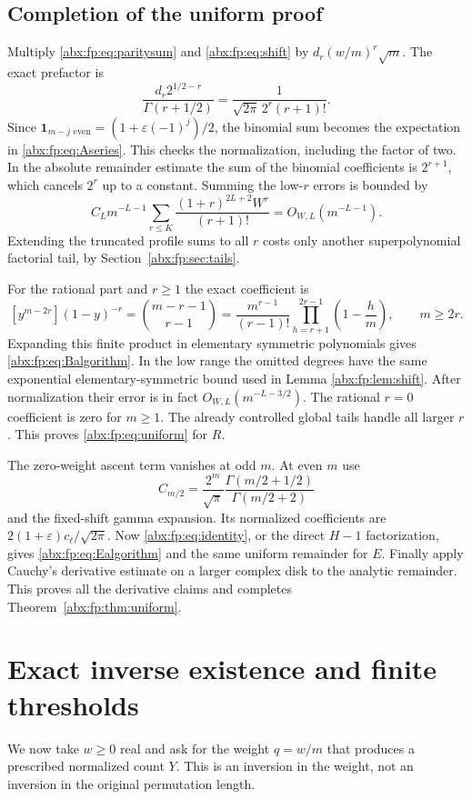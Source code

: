 \documentclass[11pt,letterpaper]{article}
\numberwithin{equation}{section}
\theoremstyle{remark}\newtheorem{remark}[theorem]{Remark}
\newcommand{\eps}{\varepsilon}
\newcommand{\ind}{\mathbf 1}
\newcommand{\sq}{\sqrt{2\pi}}
\begin{document}
\subsection{Completion of the uniform proof}\label{abx:fp:sub:completion}
Multiply \eqref{abx:fp:eq:paritysum} and \eqref{abx:fp:eq:shift} by
$d_r(w/m)^r\sqrt m$. The exact prefactor is
\[
 \frac{d_r2^{1/2-r}}{\Gamma(r+1/2)}
     =\frac1{\sq\,2^r(r+1)!}.
\]
Since $\ind_{m-j\text{ even}}=(1+\eps(-1)^j)/2$, the binomial sum
becomes the expectation in \eqref{abx:fp:eq:Aseries}. This checks the
normalization, including the factor of two. In the absolute remainder
estimate the sum of the binomial coefficients is $2^{r+1}$, which
cancels $2^r$ up to a constant. Summing the low-$r$ errors is bounded by
\begin{equation}\label{abx:fp:eq:sumerror}
 C_Lm^{-L-1}\sum_{r\le K}\frac{(1+r)^{2L+2}W^r}{(r+1)!}
      =O_{W,L}(m^{-L-1}).
\end{equation}
Extending the truncated profile sums to all $r$ costs only another
superpolynomial factorial tail, by Section~\ref{abx:fp:sec:tails}.

For the rational part and $r\ge1$ the exact coefficient is
\begin{equation}\label{abx:fp:eq:rational}
 [y^{m-2r}](1-y)^{-r}
  =\binom{m-r-1}{r-1}
  =\frac{m^{r-1}}{(r-1)!}
        \prod_{h=r+1}^{2r-1}\left(1-\frac hm\right),
 \qquad m\ge2r.
\end{equation}
Expanding this finite product in elementary symmetric polynomials gives
\eqref{abx:fp:eq:Balgorithm}. In the low range the omitted degrees have the
same exponential elementary-symmetric bound used in Lemma
\ref{abx:fp:lem:shift}. After normalization their error is in fact
$O_{W,L}(m^{-L-3/2})$. The rational $r=0$ coefficient is zero for
$m\ge1$. The already controlled global tails handle all larger $r$.
This proves \eqref{abx:fp:eq:uniform} for $R$.

The zero-weight ascent term vanishes at odd $m$. At even $m$ use
\[
 C_{m/2}=\frac{2^m}{\sqrt\pi}
       \frac{\Gamma(m/2+1/2)}{\Gamma(m/2+2)}
\]
and the fixed-shift gamma expansion. Its normalized coefficients are
$2(1+\eps)c_\ell/\sq$. Now \eqref{abx:fp:eq:identity}, or the direct
$H-1$ factorization, gives \eqref{abx:fp:eq:Ealgorithm} and the same uniform
remainder for $E$. Finally apply Cauchy's derivative estimate on a
larger complex disk to the analytic remainder. This proves all the
derivative claims and completes Theorem~\ref{abx:fp:thm:uniform}.

\section{Exact inverse existence and finite thresholds}\label{abx:fp:sec:exactinverse}
We now take $w\ge0$ real and ask for the weight $q=w/m$ that produces
a prescribed normalized count $Y$. This is an inversion in the weight,
not an inversion in the original permutation length.
\end{document}
